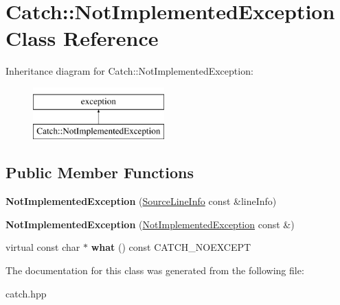 \hypertarget{classCatch_1_1NotImplementedException}{}\section{Catch\+:\+:Not\+Implemented\+Exception Class Reference}
\label{classCatch_1_1NotImplementedException}
Inheritance diagram for Catch\+:\+:Not\+Implemented\+Exception\+:\begin{figure}[H]
\begin{center}
\leavevmode
\includegraphics[height=2.000000cm]{classCatch_1_1NotImplementedException}
\end{center}
\end{figure}
\subsection*{Public Member Functions}
\begin{DoxyCompactItemize}
\item 
\mbox{\label{classCatch_1_1NotImplementedException_ab4f0a5c39d8ffb72c664e2c07e180634}} 
{\bfseries Not\+Implemented\+Exception} (\hyperlink{structCatch_1_1SourceLineInfo}{Source\+Line\+Info} const \&line\+Info)
\item 
\mbox{\label{classCatch_1_1NotImplementedException_a508a7a833455da2d3c10ea1a9d45e982}} 
{\bfseries Not\+Implemented\+Exception} (\hyperlink{classCatch_1_1NotImplementedException}{Not\+Implemented\+Exception} const \&)
\item 
\mbox{\label{classCatch_1_1NotImplementedException_ad4c13963f1a8feacda0cd331adda89e3}} 
virtual const char $\ast$ {\bfseries what} () const C\+A\+T\+C\+H\+\_\+\+N\+O\+E\+X\+C\+E\+PT
\end{DoxyCompactItemize}


The documentation for this class was generated from the following file\+:\begin{DoxyCompactItemize}
\item 
catch.\+hpp\end{DoxyCompactItemize}
